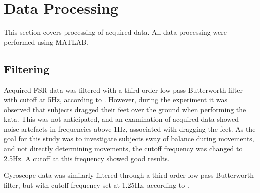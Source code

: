 \section{Data Processing}
This section covers processing of acquired data. All data processing were performed using MATLAB. 

\subsection{Filtering} \label{subsec:filtering}


Acquired FSR data was filtered with a third order low pass Butterworth filter with cutoff at 5Hz, according to \cite{Prieto1996}. 
However, during the experiment it was observed that subjects dragged their feet over the ground when performing the kata. This was not anticipated, and an examination of acquired data showed noise artefacts in frequencies above 1Hz, associated with dragging the feet. As the goal for this study was to investigate subjects sway of balance during movements, and not directly determining movements, the cutoff frequency was changed to 2.5Hz. A cutoff at this frequency showed good results.

Gyroscope data was similarly filtered through a third order low pass Butterworth filter, but with cutoff frequency set at 1.25Hz, according to \cite{Alberts2015}. 





